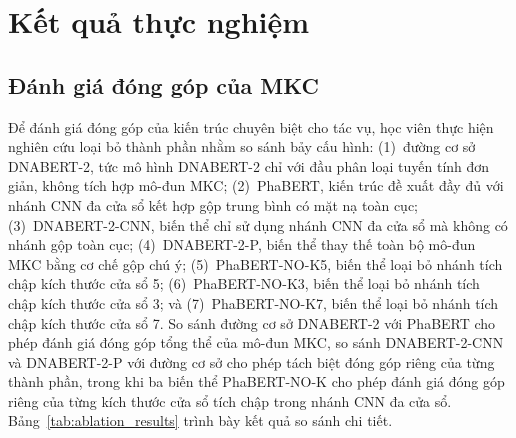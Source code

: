 \section{Kết quả thực nghiệm}
\label{sec:ket_qua}

\subsection{Đánh giá đóng góp của MKC}

Để đánh giá đóng góp của kiến trúc chuyên biệt cho tác vụ, học viên thực hiện nghiên cứu loại bỏ thành phần nhằm so sánh bảy cấu hình: (1)~đường cơ sở DNABERT-2, tức mô hình DNABERT-2 chỉ với đầu phân loại tuyến tính đơn giản, không tích hợp mô-đun MKC; (2)~PhaBERT, kiến trúc đề xuất đầy đủ với nhánh CNN đa cửa sổ kết hợp gộp trung bình có mặt nạ toàn cục; (3)~DNABERT-2-CNN, biến thể chỉ sử dụng nhánh CNN đa cửa sổ mà không có nhánh gộp toàn cục; (4)~DNABERT-2-P, biến thể thay thế toàn bộ mô-đun MKC bằng cơ chế gộp chú ý; (5)~PhaBERT-NO-K5, biến thể loại bỏ nhánh tích chập kích thước cửa sổ 5; (6)~PhaBERT-NO-K3, biến thể loại bỏ nhánh tích chập kích thước cửa sổ 3; và (7)~PhaBERT-NO-K7, biến thể loại bỏ nhánh tích chập kích thước cửa sổ 7. So sánh đường cơ sở DNABERT-2 với PhaBERT cho phép đánh giá đóng góp tổng thể của mô-đun MKC, so sánh DNABERT-2-CNN và DNABERT-2-P với đường cơ sở cho phép tách biệt đóng góp riêng của từng thành phần, trong khi ba biến thể PhaBERT-NO-K cho phép đánh giá đóng góp riêng của từng kích thước cửa sổ tích chập trong nhánh CNN đa cửa sổ. Bảng~\ref{tab:ablation_results} trình bày kết quả so sánh chi tiết.

